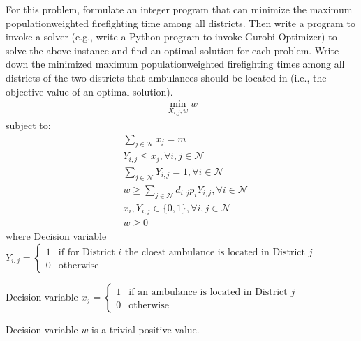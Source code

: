 \documentclass[letterpaper,10pt,english]{sphinxmanual}
\begin{document}
\sphinxAtStartPar
For this problem, formulate an integer program that can minimize the maximum population\sphinxhyphen{}weighted firefighting time among all
districts. Then write a program to invoke a solver (e.g., write a Python program to invoke Gurobi Optimizer) to solve the
above instance and find an optimal solution for each problem. Write down the minimized maximum population\sphinxhyphen{}weighted
firefighting times among all districts of the two districts that ambulances should be located in (i.e., the objective value
of an optimal solution).
\begin{equation*}
\begin{split}\min_{X_{i,j}, w} w\end{split}
\end{equation*}
\sphinxAtStartPar
subject to:
\begin{equation*}
\begin{split}& \sum_{j \in \mathcal{N}} x_{j} = m \\
& Y_{i,j} \leq x_{j}, \forall i,j \in \mathcal{N} \\
& \sum_{j \in \mathcal{N}} Y_{i,j} = 1 , \forall i \in \mathcal{N} \\
& w \geq \sum_{j \in \mathcal{N}} d_{i,j} p_{i} Y_{i,j} , \forall i \in \mathcal{N} \\
& x_{i}, Y_{i,j} \in \{ 0,1 \}, \forall i,j \in \mathcal{N} \\
& w \geq 0\end{split}
\end{equation*}
\sphinxAtStartPar
where Decision variable \(Y_{i,j} = \left\{\begin{matrix}
1 & \text{if for District } i \text{ the cloest ambulance is located in District } j\\
0 & \text{otherwise}
\end{matrix}\right.\)

\sphinxAtStartPar
Decision variable \(x_{j} = \left\{\begin{matrix}
1 & \text{if an ambulance is located in District } j\\
0 & \text{otherwise}
\end{matrix}\right.\)

\sphinxAtStartPar
Decision variable \(w\) is a trivial positive value.
\end{document}
